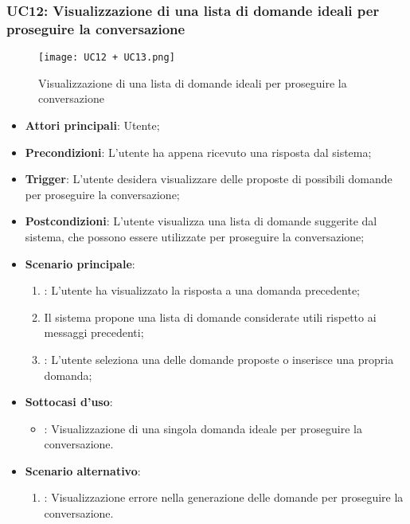 \newpage

\hypertarget{UC12}{}
\subsubsection{UC12: Visualizzazione di una lista di domande ideali per proseguire la conversazione}

\begin{figure}[h]
    \centering
    \texttt{[image: UC12 + UC13.png]}
    \caption{Visualizzazione di una lista di domande ideali per proseguire la conversazione}
\end{figure}

\begin{itemize}
    \item \textbf{Attori principali}: Utente;
    \item \textbf{Precondizioni}: L'utente ha appena ricevuto una risposta dal sistema;
    \item \textbf{Trigger}: L'utente desidera visualizzare delle proposte di possibili domande per proseguire la conversazione;
    \item \textbf{Postcondizioni}: L'utente visualizza una lista di domande suggerite dal sistema, che possono essere utilizzate per proseguire la conversazione;
    \item \textbf{Scenario principale}:
    \begin{enumerate}
        \item {}: L'utente ha visualizzato la risposta a una domanda precedente;
        \item Il sistema propone una lista di domande considerate utili rispetto ai messaggi precedenti;
        \item {}: L'utente seleziona una delle domande proposte o inserisce una propria domanda;
    \end{enumerate}
    \item \textbf{Sottocasi d'uso}:
    \begin{itemize}
        \item {}: Visualizzazione di una singola domanda ideale per proseguire la conversazione.
    \end{itemize}
    \item \textbf{Scenario alternativo}:
    \begin{enumerate}
        \item {}: Visualizzazione errore nella generazione delle domande per proseguire la conversazione.
    \end{enumerate}
\end{itemize}

